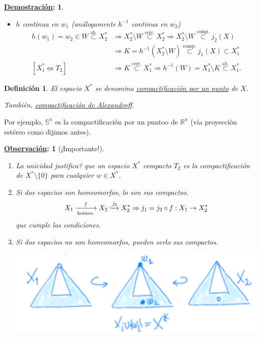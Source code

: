 \documentclass[10pt,a4paper,openright]{book}
\theoremstyle{break}
\newtheorem*{defi}{Definición}
\newtheorem*{demo}{\underline{Demostración}:}
\newtheorem*{obs}{\underline{Observación}:}
\begin{document}
\begin{demo}
\begin{enumerate}
\begin{itemize}
        \item $h$ continua en $w_1$ (análogamente $h^{-1}$ continua en $w_2$)
        \begin{align*}
            h\left( w_1 \right) = w_2 \in W \stackrel{\text{ab.}}{\subset} X_2^* &\Rightarrow X_2^* \setminus W \stackrel{\text{cerr.}}{\subset} X_2^* \Rightarrow X_2^* \setminus W \stackrel{\text{comp.}}{\subset} j_2\left( X \right)\\
            &\Rightarrow K = h^{-1}\left( X_2^* \setminus W \right) \stackrel{\text{comp.}}{\subset} j_1\left( X \right) \subset X_1^*\\
            \left[ X_1^* \text{ es } T_2 \right] &\Rightarrow K \stackrel{\text{cerr.}}{\subset} X_1^* \Rightarrow h^{-1}\left( W \right) = X_1^* \setminus K \stackrel{\text{ab.}}{\subset} X_1^*
        .\end{align*}
    \end{itemize}
\end{enumerate}
\end{demo}

\begin{defi}
El espacio $X^*$ se denomina \underline{compactificación por un punto} de $X$. 

También, \underline{compactificación de Alexandroff}.
\end{defi}
Por ejemplo, $\mathbb{S}^n$ es la compactificación por un puntoo de $\mathbb{R}^n$ (vía proyección estéreo como dijimos antes).

\begin{obs}[¡Importante!]
\begin{enumerate}
    \item La unicidad justifica? que un espacio $X^*$ compacto $T_2$ es la compactificación de $X^* \setminus \{0\}$ para cualquier $w \in X^*$.

    \item Si dos espacios son homeomorfos, lo son sus compactos.
    \[
        X_1 \xrightarrow[\text{homeo.}]{f} X_2 \xhookrightarrow{j_2} X_2^* \Rightarrow j_1 = j_2 \circ f : X_1 \rightarrow X_2^*
    \]
    que cumple las condiciones.

    \item Si dos espacios no son homeomorfos, pueden serlo sus compactos.
    \begin{center}
        \includegraphics[scale=0.3]{images/obs_comp_pto} 
    \end{center}
\end{enumerate} 
\end{obs}
\end{document}
